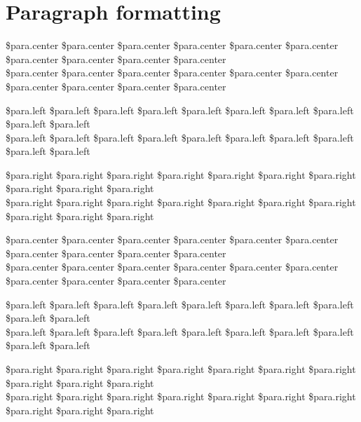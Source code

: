 \documentclass[demo]{pyscribe}
\begin{document}
\section{Paragraph formatting}







\par{\centering
\$para.center \$para.center \$para.center \$para.center \$para.center \$para.center \$para.center \$para.center \$para.center \$para.center  \\ \$para.center \$para.center \$para.center \$para.center \$para.center \$para.center \$para.center \$para.center \$para.center \$para.center  \\
\par{\raggedright
\$para.left \$para.left \$para.left \$para.left \$para.left \$para.left \$para.left \$para.left \$para.left \$para.left  \\ \$para.left \$para.left \$para.left \$para.left \$para.left \$para.left \$para.left \$para.left \$para.left \$para.left  \\
\par{\raggedleft
\$para.right \$para.right \$para.right \$para.right \$para.right \$para.right \$para.right \$para.right \$para.right \$para.right  \\ \$para.right \$para.right \$para.right \$para.right \$para.right \$para.right \$para.right \$para.right \$para.right \$para.right  \\
\par{\centering
\$para.center \$para.center \$para.center \$para.center \$para.center \$para.center \$para.center \$para.center \$para.center \$para.center  \\ \$para.center \$para.center \$para.center \$para.center \$para.center \$para.center \$para.center \$para.center \$para.center \$para.center  \\
\par{\raggedright
\$para.left \$para.left \$para.left \$para.left \$para.left \$para.left \$para.left \$para.left \$para.left \$para.left  \\ \$para.left \$para.left \$para.left \$para.left \$para.left \$para.left \$para.left \$para.left \$para.left \$para.left  \\
\par{\raggedleft
\$para.right \$para.right \$para.right \$para.right \$para.right \$para.right \$para.right \$para.right \$para.right \$para.right  \\ \$para.right \$para.right \$para.right \$para.right \$para.right \$para.right \$para.right \$para.right \$para.right \$para.right  \\ \par}\par}\par}\par}\par}\par}
\end{document}
